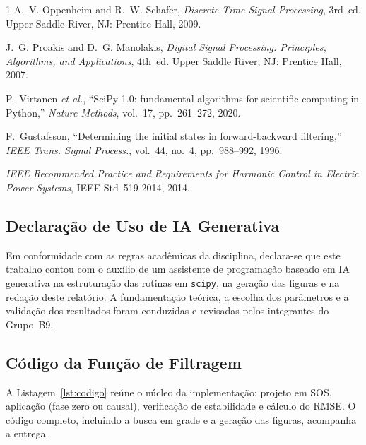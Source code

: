 \documentclass[conference]{IEEEtran}
\begin{document}
\begin{thebibliography}{1}
A.~V. Oppenheim and R.~W. Schafer, \emph{Discrete-Time Signal Processing},
3rd~ed. Upper Saddle River, NJ: Prentice Hall, 2009.

J.~G. Proakis and D.~G. Manolakis, \emph{Digital Signal Processing: Principles,
Algorithms, and Applications}, 4th~ed. Upper Saddle River, NJ: Prentice Hall,
2007.

P.~Virtanen \emph{et al.}, ``SciPy 1.0: fundamental algorithms for scientific
computing in Python,'' \emph{Nature Methods}, vol.~17, pp.~261--272, 2020.

F.~Gustafsson, ``Determining the initial states in forward-backward filtering,''
\emph{IEEE Trans. Signal Process.}, vol.~44, no.~4, pp.~988--992, 1996.

\emph{IEEE Recommended Practice and Requirements for Harmonic Control in Electric
Power Systems}, IEEE Std~519-2014, 2014.
\end{thebibliography}

\appendix

\subsection{Declaração de Uso de IA Generativa}
Em conformidade com as regras acadêmicas da disciplina, declara-se que este
trabalho contou com o auxílio de um assistente de programação baseado em IA
generativa na estruturação das rotinas em \texttt{scipy}, na geração das figuras e
na redação deste relatório. A fundamentação teórica, a escolha dos parâmetros e a
validação dos resultados foram conduzidas e revisadas pelos integrantes do
Grupo~B9.

\subsection{Código da Função de Filtragem}
A Listagem~\ref{lst:codigo} reúne o núcleo da implementação: projeto em SOS,
aplicação (fase zero ou causal), verificação de estabilidade e cálculo do RMSE. O
código completo, incluindo a busca em grade e a geração das figuras, acompanha a
entrega.
\end{document}

